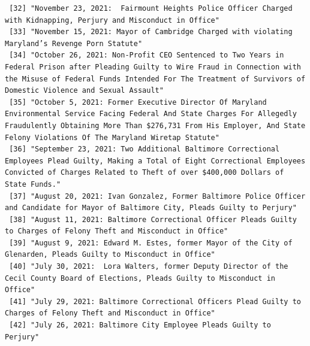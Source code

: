 \documentclass[
  letterpaper,
  DIV=11,
  numbers=noendperiod]{scrreprt}
\begin{document}
\begin{verbatim}
 [32] "November 23, 2021:  Fairmount Heights Police Officer Charged with Kidnapping, Perjury and Misconduct in Office"                                                                                                                                      
 [33] "November 15, 2021: Mayor of Cambridge Charged with violating Maryland’s Revenge Porn Statute"                                                                                                                                                        
 [34] "October 26, 2021: Non-Profit CEO Sentenced to Two Years in Federal Prison after Pleading Guilty to Wire Fraud in Connection with the Misuse of Federal Funds Intended For The Treatment of Survivors of Domestic Violence and Sexual Assault"        
 [35] "October 5, 2021: Former Executive Director Of Maryland Environmental Service Facing Federal And State Charges For Allegedly Fraudulently Obtaining More Than $276,731 From His Employer, And State Felony Violations Of The Maryland Wiretap Statute"
 [36] "September 23, 2021: Two Additional Baltimore Correctional Employees Plead Guilty, Making a Total of Eight Correctional Employees Convicted of Charges Related to Theft of over $400,000 Dollars of State Funds."                                     
 [37] "August 20, 2021: Ivan Gonzalez, Former Baltimore Police Officer and Candidate for Mayor of Baltimore City, Pleads Guilty to Perjury"                                                                                                                 
 [38] "August 11, 2021: Baltimore Correctional Officer Pleads Guilty to Charges of Felony Theft and Misconduct in Office"                                                                                                                                   
 [39] "August 9, 2021: Edward M. Estes, former Mayor of the City of Glenarden, Pleads Guilty to Misconduct in Office"                                                                                                                                       
 [40] "July 30, 2021:  Lora Walters, former Deputy Director of the Cecil County Board of Elections, Pleads Guilty to Misconduct in Office"                                                                                                                  
 [41] "July 29, 2021: Baltimore Correctional Officers Plead Guilty to Charges of Felony Theft and Misconduct in Office"                                                                                                                                     
 [42] "July 26, 2021: Baltimore City Employee Pleads Guilty to Perjury"                                                                                                                                                                                     

\end{verbatim}
\end{document}
